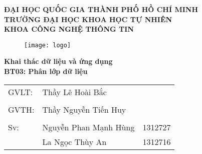 \begin{titlepage}
\begin{center}
	\large{\textbf{ĐẠI HỌC QUỐC GIA THÀNH PHỐ HỒ CHÍ MINH}}\\
	\large{\textbf{TRƯỜNG ĐẠI HỌC KHOA HỌC TỰ NHIÊN}}\\
	\large{\textbf{KHOA CÔNG NGHỆ THÔNG TIN}}\\
	\vfill
	\begin{figure}[H]
		\centerline{\texttt{[image: logo]}}
	\end{figure}

	\Large{\textbf{Khai thác dữ liệu và ứng dụng}}\\
	\Large{\textbf{BT03: Phân lớp dữ liệu}}\\

\end{center}
	\vfill
\begin{flushright}
	
	\begin{tabular}{l l l}
		GVLT: &Thầy Lê Hoài Bắc\\
		&\\
		GVTH: &Thầy Nguyễn Tiến Huy\\
		&\\
		Sv: &Nguyễn Phan Mạnh Hùng & 1312727\\
		&La Ngọc Thùy An & 1312716\\
	\end{tabular}
\end{flushright}


\end{titlepage}
